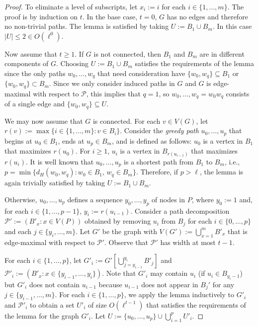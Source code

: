 \documentclass[kpfonts]{patmorin}
\theoremstyle{named}
\begin{document}
\begin{proof}
    To eliminate a level of subscripts, let $x_i:=i$ for each $i\in\{1,\ldots,m\}$.  The proof is by induction on $t$. In the base case, $t=0$, $G$ has no edges and therefore no non-trivial paths. The lemma is satisfied by taking $U:=B_{1}\cup B_{m}$.  In this case $|U|\le 2\in O(\ell^0)$.

    Now assume that $t\ge 1$. If $G$ is not connected, then $B_{1}$ and $B_{m}$ are in different components of $G$.  Choosing $U:=B_{1}\cup B_{m}$ satisfies the requirements of the lemma since the only paths $w_0,\ldots,w_q$ that need consideration have $\{w_0,w_q\}\subseteq B_1$ or $\{w_0,w_q\}\subset B_m$.  Since we only consider induced paths in $G$ and $G$ is edge-maximal with respect to $\mathcal{P}$, this implies that $q=1$, so $w_0,\ldots,w_q=w_0w_q$ consists of a single edge and $\{w_0,w_q\}\subseteq U$.

    We may now assume that $G$ is connected. For each $v\in V(G)$, let $r(v):=\max\{i\in\{1,\ldots,m\}:v\in B_i\}$.  Consider the \emph{greedy path} $u_0,\ldots,u_p$ that begins at $u_0\in B_{1}$, ends at $u_p\in B_{m}$, and is defined as follows: $u_0$ is a vertex in $B_{1}$ that maximizes $r(u_0)$.  For $i\ge 1$, $u_i$ is a vertex in $B_{r(u_{i-1})}$ that maximizes $r(u_i)$.  It is well known that $u_0,\ldots,u_p$ is a shortest path from $B_{1}$ to $B_{m}$, i.e., $p=\min\{d_H(w_0,w_q): w_0\in B_1,\, w_q\in B_m\}$.  Therefore, if $p>\ell$, the lemma is again trivially satisfied by taking $U:=B_{1}\cup B_{m}$.

    Otherwise, $u_0,\ldots,u_p$ defines a sequence $y_0,\ldots,y_p$ of nodes in $P$, where $y_0:=1$ and, for each $i\in\{1,\ldots,p-1\}$, $y_{i}:=r(u_{i-1})$.  Consider a path decomposition $\mathcal{P'}:=(B'_x:x\in V(P))$  obtained by removing $u_i$ from $B_{j}$ for each $i\in\{0,\ldots,p\}$ and each $j\in\{y_i,\ldots,m\}$. Let $G'$ be the graph with $V(G'):=\bigcup_{x=1}^m B'_x$ that is edge-maximal with respect to $\mathcal{P}'$.  Observe that $\mathcal{P'}$ has width at most $t-1$.

    For each $i\in\{1,\ldots,p\}$, let $G'_i:=G'[\bigcup_{j=y_{i-1}}^{y_i}B'_j]$ and $\mathcal{P}'_i:=(B'_x:x\in\{y_{i-1},\ldots,y_i\})$.
    Note that $G'_i$ may contain $u_i$ (if $u_i\in B_{y_i-1}$) but $G'_i$ does not contain $u_{i-1}$ because $u_{i-1}$ does not appear in $B_j'$ for any $j\in\{y_{i-1},\ldots,m\}$.  For each $i\in\{1,\ldots,p\}$, we apply the lemma inductively to $G'_i$ and $\mathcal{P}'_i$ to obtain a set $U'_i$ of size $O(\ell^{t-1})$ that satisfies the requirements of the lemma for the graph $G'_i$. Let $U:=\{u_0,\ldots,u_p\}\cup\bigcup_{i=1}^p U'_i$.


\end{proof}
\end{document}
